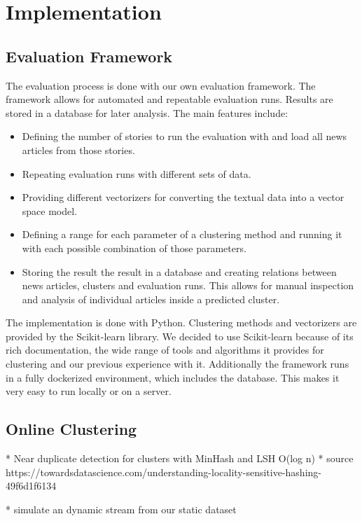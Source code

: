 \section{Implementation}

\subsection{Evaluation Framework}
The evaluation process is done with our own evaluation framework. The framework allows for automated and repeatable evaluation runs. Results are stored in a database for later analysis. The main features include:

\begin{itemize}
    \item Defining the number of stories to run the evaluation with and load all news articles from those stories. 
    \item Repeating evaluation runs with different sets of data.
    \item Providing different vectorizers for converting the textual data into a vector space model.
    \item Defining a range for each parameter of a clustering method and running it with each possible combination of those parameters. 
    \item Storing the result the result in a database and creating relations between news articles, clusters and evaluation runs. This allows for manual inspection and analysis of individual articles inside a predicted cluster. 
\end{itemize}

The implementation is done with Python. Clustering methods and vectorizers are provided by the Scikit-learn library. We decided to use Scikit-learn because of its rich documentation, the wide range of tools and algorithms it provides for clustering and our previous experience with it. Additionally the framework runs in a fully dockerized environment, which includes the database. This makes it very easy to run locally or on a server. 


\subsection{Online Clustering}

* Near duplicate detection for clusters with MinHash and LSH O(log n)
* source https://towardsdatascience.com/understanding-locality-sensitive-hashing-49f6d1f6134

* simulate an dynamic stream from our static dataset